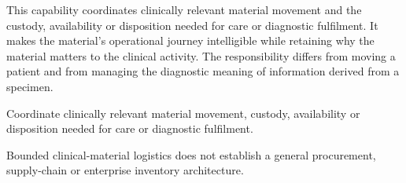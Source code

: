 This capability coordinates clinically relevant material movement and the custody, availability or disposition needed for care or diagnostic fulfilment. It makes the material's operational journey intelligible while retaining why the material matters to the clinical activity. The responsibility differs from moving a patient and from managing the diagnostic meaning of information derived from a specimen.



Coordinate clinically relevant material movement, custody, availability or disposition needed for care or diagnostic fulfilment.



Bounded clinical-material logistics does not establish a general procurement, supply-chain or enterprise inventory architecture.


